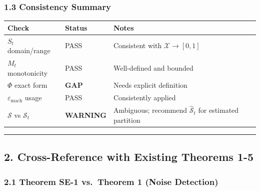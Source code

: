 \documentclass[
  12pt,
]{ctexart}
\begin{document}
\subsubsection{1.3 Consistency Summary}\label{consistency-summary}

\begin{longtable}[]{@{}
  >{\raggedright\arraybackslash}p{}
  >{\raggedright\arraybackslash}p{}
  >{\raggedright\arraybackslash}p{}@{}}
\toprule\noalign{}
\begin{minipage}[b]{\linewidth}\raggedright
Check
\end{minipage} & \begin{minipage}[b]{\linewidth}\raggedright
Status
\end{minipage} & \begin{minipage}[b]{\linewidth}\raggedright
Notes
\end{minipage} \\
\midrule\noalign{}
\endhead
\bottomrule\noalign{}
\endlastfoot
\(S_t\) domain/range & PASS & Consistent with
\(\mathcal{X} \to [0,1]\) \\
\(M_t\) monotonicity & PASS & Well-defined and bounded \\
\(\Phi\) exact form & \textbf{GAP} & Needs explicit definition \\
\(\varepsilon_{\text{mach}}\) usage & PASS & Consistently applied \\
\(\mathcal{S}\) vs \(\mathcal{S}_t\) & \textbf{WARNING} & Ambiguous;
recommend \(\hat{\mathcal{S}}_t\) for estimated partition \\
\end{longtable}

\begin{center}\rule{0.5\linewidth}{0.5pt}\end{center}

\subsection{2. Cross-Reference with Existing Theorems
1-5}\label{cross-reference-with-existing-theorems-1-5}

\subsubsection{2.1 Theorem SE-1 vs.~Theorem 1 (Noise
Detection)}\label{theorem-se-1-vs.-theorem-1-noise-detection}
\end{document}
